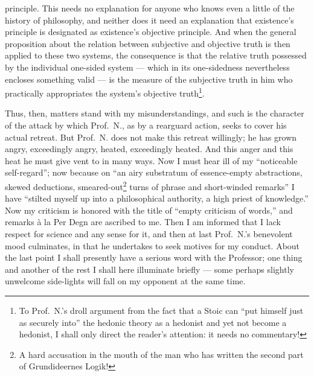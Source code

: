 \documentclass[12pt,a4paper]{book}
\begin{document}
principle. This needs no explanation for anyone who knows even a little of the
history of philosophy, and neither does it need an explanation that existence's
principle is designated as existence's objective principle. And when the general
proposition about the relation between subjective and objective truth is then
applied to these two systems, the consequence is that the relative truth
possessed by the individual one-sided system --- which in its one-sidedness
nevertheless encloses something valid --- is the measure of the subjective truth
in him who practically appropriates the system's objective truth\footnote{%
  To Prof.\ N.'s droll argument from the fact that a Stoic can ``put himself
  just as securely into'' the hedonic theory as a hedonist and yet not become a
  hedonist, I shall only direct the reader's attention: it needs no commentary!}.

Thus, then, matters stand with my misunderstandings, and such is the character
of the attack by which Prof.\ N., as by a rearguard action, seeks to cover his
actual retreat. But Prof.\ N. does not make this retreat willingly; he has grown
angry, exceedingly angry, heated, exceedingly heated. And this anger and this
heat he must give vent to in
\setcounter{footnote}{0}
many ways. Now I must hear ill of my ``noticeable self-regard''; now because on
``an airy substratum of essence-empty abstractions, skewed deductions,
smeared-out\footnote{%
  A hard accusation in the mouth of the man who has written the second part of
  Grundideernes Logik!} turns of phrase and short-winded remarks'' I have
``stilted myself up into a philosophical authority, a high priest of
knowledge.'' Now my criticism is honored with the title of ``empty criticism of
words,'' and remarks à la Per Degn are ascribed to me. Then I am informed that I
lack respect for science and any sense for it, and then at last Prof.\ N.'s
benevolent mood culminates, in that he undertakes to seek motives for my
conduct. About the last point I shall presently have a serious word with the
Professor; one thing and another of the rest I shall here illuminate briefly ---
some perhaps slightly unwelcome side-lights will fall on my opponent at the same
time.
\end{document}
